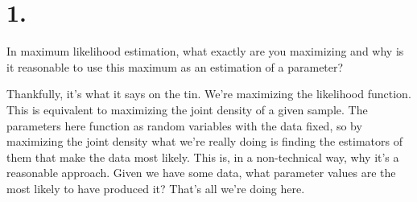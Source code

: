 \section*{1.}

In maximum likelihood estimation, what exactly are you maximizing and why is it reasonable to use this maximum as an estimation of a parameter?

Thankfully, it's what it says on the tin. We're maximizing the likelihood function. This is equivalent to maximizing the joint density of a given sample. The parameters here function as random variables with the data fixed, so by maximizing the joint density what we're really doing is finding the estimators of them that make the data most likely. This is, in a non-technical way, why it's a reasonable approach. Given we have some data, what parameter values are the most likely to have produced it? That's all we're doing here.
